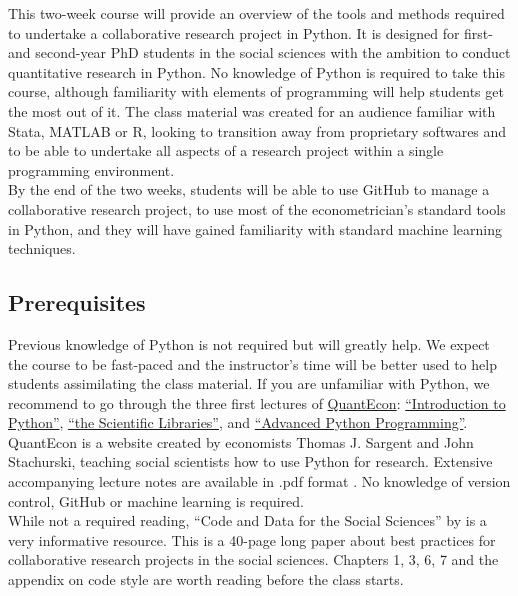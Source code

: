 \documentclass{amsart}
\theoremstyle{definition}
\theoremstyle{remark}
\numberwithin{equation}{section}
\begin{document}
This two-week course will provide an overview of the tools and methods required to undertake a collaborative research project in Python. It is designed for first- and second-year PhD students in the social sciences with the ambition to conduct quantitative research in Python. No knowledge of Python is required to take this course, although familiarity with elements of programming will help students get the most out of it. The class material was created for an audience familiar with Stata, MATLAB or R, looking to transition away from proprietary softwares and to be able to undertake all aspects of a research project within a single programming environment. \\

By the end of the two weeks, students will be able to use GitHub to manage a collaborative research project, to use most of the econometrician's standard tools in Python, and they will have gained familiarity with standard machine learning techniques.

\subsection*{Prerequisites}

Previous knowledge of Python is not required but will greatly help. We expect the course to be fast-paced and the instructor's time will be better used to help students assimilating the class material. If you are unfamiliar with Python, we recommend to go through the three first lectures of \href{https://lectures.quantecon.org/py/}{QuantEcon}: \href{https://lectures.quantecon.org/py/index_learning_python.html}{``Introduction to Python''}, \href{https://lectures.quantecon.org/py/index_python_scientific_libraries.html}{``the Scientific Libraries''}, and \href{https://lectures.quantecon.org/py/index_advanced_python_programming.html}{``Advanced Python Programming''}. QuantEcon is a website created by economists Thomas J. Sargent and John Stachurski, teaching social scientists how to use Python for research. Extensive accompanying lecture notes are available in .pdf format \citep{sargent2019lectures}. No knowledge of version control, GitHub or machine learning is required.\\

While not a required reading, ``Code and Data for the Social Sciences'' by \cite{gentzkow2014code} is a very informative resource. This is a 40-page long paper about best practices for collaborative research projects in the social sciences. Chapters 1, 3, 6, 7 and the appendix on code style are worth reading before the class starts.
\end{document}
